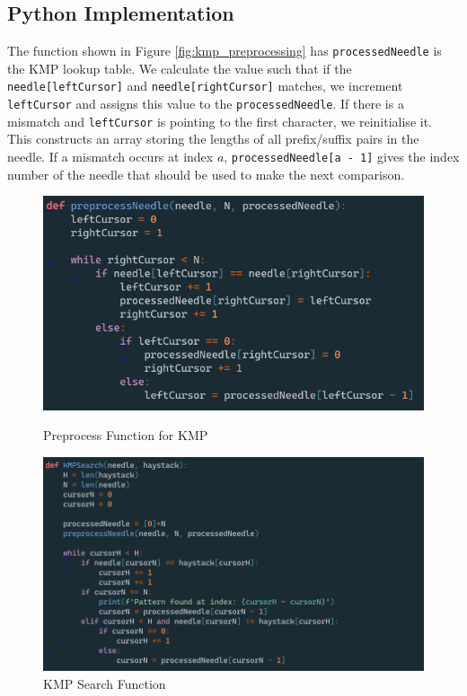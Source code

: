 \subsection*{Python Implementation}

The function shown in Figure \ref{fig:kmp_preprocessing} has \texttt{processedNeedle} is the KMP lookup table. We calculate the value such that if the \texttt{needle[leftCursor]} and \texttt{needle[rightCursor]} matches, we increment \texttt{leftCursor} and assigns this value to the \texttt{processedNeedle}. If there is a mismatch and \texttt{leftCursor} is pointing to the first character, we reinitialise it. This constructs an array storing the lengths of all prefix/suffix pairs in the needle. If a mismatch occurs at index $a$, \texttt{processedNeedle[a - 1]} gives the index number of the needle that should be used to make the next comparison. 

\begin{figure}[H]
  \centering
  \begin{minipage}[b]{0.49\textwidth}
    \includegraphics[width=\textwidth]{images/preprocessKMP.png}
    \caption{Preprocess Function for KMP}
    \label{fig:kmp_preprocessing}
  \end{minipage}
  \hfill
  \begin{minipage}[b]{0.49\textwidth}
    \includegraphics[width=\textwidth]{images/KMP.png}
    \caption{KMP Search Function}
    \label{fig:kmp_search}
  \end{minipage}
\end{figure}

